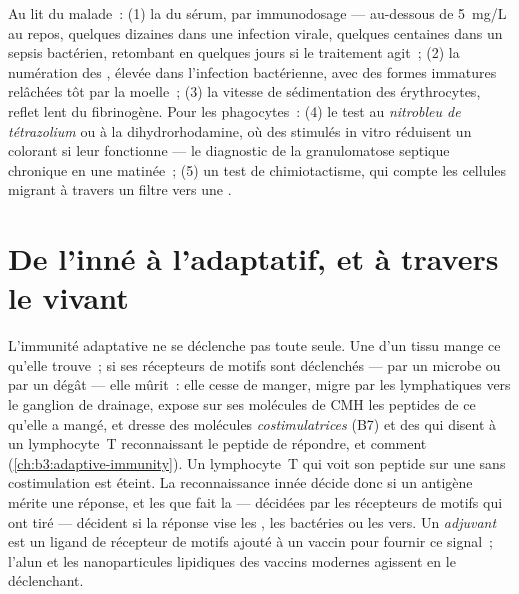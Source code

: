\begin{method}\label{met:b3:innate-immunity:tests}
Au lit du malade~: (1) la \emph{} du sérum, par
immunodosage --- au-dessous de \qty{5}{mg/L} au repos, quelques dizaines
dans une infection virale, quelques centaines dans un sepsis bactérien,
retombant en quelques jours si le traitement agit~; (2) la numération
des , élevée dans l'infection bactérienne, avec des formes
immatures relâchées tôt par la moelle~; (3) la vitesse de sédimentation
des érythrocytes, reflet lent du fibrinogène. Pour les phagocytes~: (4)
le test au \emph{nitrobleu de tétrazolium} ou à la dihydrorhodamine, où
des  stimulés in vitro réduisent un colorant si leur  fonctionne --- le diagnostic de la granulomatose septique
chronique en une matinée~; (5) un test de chimiotactisme, qui compte les
cellules migrant à travers un filtre vers une .
\end{method}

\section{De l'inné à l'adaptatif, et à travers le vivant}

\begin{proposition}\label{prop:b3:innate-immunity:bridge}
L'immunité adaptative ne se déclenche pas toute seule. Une
\emph{} d'un tissu mange ce qu'elle trouve~; si ses
récepteurs de motifs sont déclenchés --- par un microbe ou par un dégât
--- elle mûrit~: elle cesse de manger, migre par les lymphatiques vers
le ganglion de drainage, expose sur ses molécules de CMH les peptides de
ce qu'elle a mangé, et dresse des molécules \emph{costimulatrices} (B7)
et des  qui disent à un lymphocyte~T reconnaissant le peptide
de répondre, et comment (\cref{ch:b3:adaptive-immunity}). Un
lymphocyte~T qui voit son peptide sur une  sans
costimulation est éteint. La reconnaissance innée décide donc si un
antigène mérite une réponse, et les  que fait la  --- décidées par les récepteurs de motifs qui ont tiré ---
décident si la réponse vise les , les bactéries ou les vers. Un
\emph{adjuvant} est un ligand de récepteur de motifs ajouté à un vaccin
pour fournir ce signal~; l'alun et les nanoparticules lipidiques des
vaccins modernes agissent en le déclenchant.
\end{proposition}

